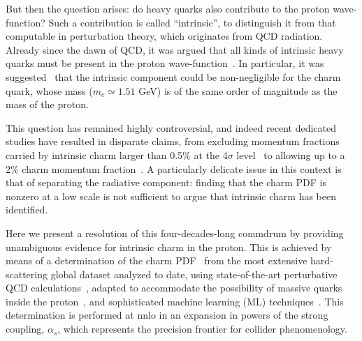 But then the question arises: do heavy quarks also contribute to the
proton wave-function? Such a contribution is called ``intrinsic'', to
distinguish it from that computable in
perturbation theory, which originates from QCD radiation.
%
Already since the dawn of QCD, it
was argued that all kinds of intrinsic heavy quarks must be
present in the
proton wave-function~\cite{Brodsky:1984nx}.
%
In particular, it was
suggested~\cite{Brodsky:1980pb}
that the intrinsic component could be non-negligible for the
charm quark, whose mass ($m_c\simeq 1.51$ GeV) is of the same order of
magnitude as the mass of the proton.

This question has remained highly controversial, and indeed recent
dedicated studies have resulted in disparate claims,
from excluding momentum fractions carried by intrinsic  charm larger than 0.5\% at the 4$\sigma$
level~\cite{Jimenez-Delgado:2014zga} to allowing up to a 2\% charm momentum
fraction~\cite{Hou:2017khm}.
%
A particularly delicate issue in this context is that of
separating the radiative component: finding that the charm PDF
is nonzero at a low scale is not sufficient to argue that intrinsic charm
has been identified.

Here we present a resolution of this four-decades-long conundrum
by providing unambiguous evidence for intrinsic charm  in the proton.
%
This is achieved by means of a determination of the charm
PDF~\cite{Ball:2021leu} from the most extensive hard-scattering  global dataset
analyzed to date, using state-of-the-art perturbative QCD
calculations~\cite{Heinrich:2020ybq}, adapted to accommodate the possibility of
massive quarks inside the proton~\cite{Forte:2010ta,Ball:2015dpa,Ball:2015tna},
and sophisticated machine learning (ML)
techniques~\cite{Ball:2016neh,Ball:2017nwa,Ball:2021leu}.
This determination is performed at \acrfull{nnlo} in an expansion in powers of
the strong coupling, $\alpha_s$, which represents the precision frontier for
collider phenomenology.
%

